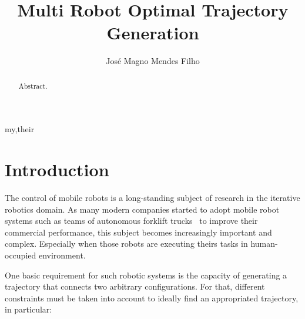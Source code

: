 \documentclass[eprint]{actapoly}
\begin{document}
\title[Trajectory Generation Approach]
{Multi Robot Optimal Trajectory Generation}

\author[J. M. Mendes Filho]{Jos\'{e} Magno Mendes Filho}{my,their}


\begin{abstract}
 Abstract.
\end{abstract}


\maketitle




\section{Introduction}





The %
control of mobile robots is a long-standing subject of research 
in the iterative robotics domain. As many modern companies started to adopt 
mobile robot systems such as teams of autonomous forklift trucks~\cite{Gizmag} 
to improve their commercial performance, this subject becomes increasingly 
important and complex. Especially when those robots are executing theirs tasks 
in human-occupied environment.


One basic requirement for such robotic systems is the capacity of generating a 
trajectory that connects two arbitrary configurations. For that, different 
constraints must be taken into account to ideally find an appropriated 
trajectory, in particular:
\end{document}

